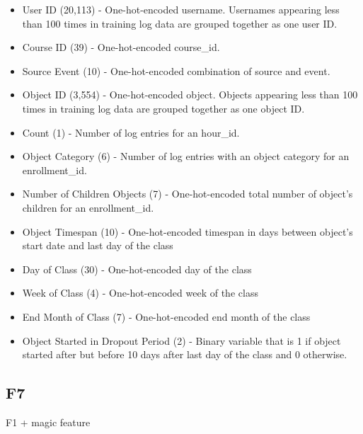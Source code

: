 \begin{itemize}
  \setlength\itemsep{0em}
  \item User ID (20,113) - One-hot-encoded username. Usernames appearing less than 100 times in training log data are grouped together as one user ID. 
  \item Course ID (39) - One-hot-encoded course\_id.
  \item Source Event (10) - One-hot-encoded combination of source and event.
  \item Object ID (3,554) - One-hot-encoded object.  Objects appearing less than 100 times in training log data are grouped together as one object ID.
  \item Count (1) - Number of log entries for an hour\_id.
  \item Object Category (6) - Number of log entries with an object category for an enrollment\_id.
  \item Number of Children Objects (7) - One-hot-encoded total number of object's children for an enrollment\_id.
  \item Object Timespan (10) - One-hot-encoded timespan in days between object's start date and last day of the class
  \item Day of Class (30) - One-hot-encoded day of the class
  \item Week of Class (4) - One-hot-encoded week of the class
  \item End Month of Class (7) - One-hot-encoded end month of the class
  \item Object Started in Dropout Period (2) - Binary variable that is 1 if object started after but before 10 days after last day of the class and 0 otherwise.
\end{itemize}

\subsection{F7}
F1 + magic feature